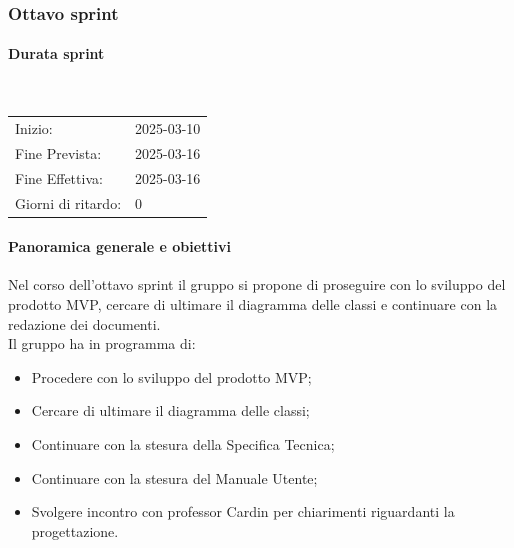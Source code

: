 \documentclass[10pt]{article}
\begin{document}
{{{{{{{{    %

    \newpage
    \subsubsection{Ottavo sprint}
    \label{ottavo-sprint$_G$}
        
        \paragraph{Durata sprint}\mbox{}\\
        \vspace{-1.5em}
        \begin{table}[h] 
        \renewcommand{\arraystretch}{1.2}  
        \begin{tabular}{ l l }
            Inizio: & 2025-03-10 \\
            Fine Prevista: & 2025-03-16 \\
            Fine Effettiva: & 2025-03-16 \\
            Giorni di ritardo: & 0 \\
        \end{tabular}
        \end{table}
        \vspace{-2em}
        {\renewcommand{\arraystretch}{1.5}%
        
        \paragraph{Panoramica generale e obiettivi}\mbox{}\vspace{0.4em}

        Nel corso dell'ottavo sprint il gruppo si propone di proseguire con lo sviluppo del prodotto MVP, cercare di ultimare il diagramma delle classi e continuare con la redazione dei documenti.
        \\
        Il gruppo ha in programma di:
        \begin{itemize}
            \item Procedere con lo sviluppo del prodotto MVP;
            \item Cercare di ultimare il diagramma delle classi;
            \item Continuare con la stesura della Specifica Tecnica;
            \item Continuare con la stesura del Manuale Utente;
            \item Svolgere incontro con professor Cardin per chiarimenti riguardanti la progettazione.
        \end{itemize}

}}}}}}}}}
\end{document}
